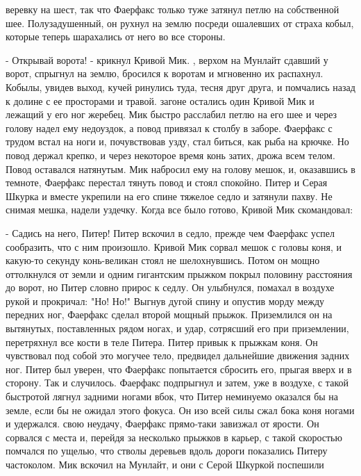 веревку на шест, так что Фаерфакс только туже затянул петлю на 
собственной шее. Полузадушенный, он рухнул на землю посреди ошалевших 
от страха кобыл, которые теперь шарахались от него во все стороны.
\par- Открывай ворота! - крикнул Кривой Мик.
, верхом на Мунлайт сдавший у ворот, спрыгнул на землю, 
бросился к воротам и мгновенно их распахнул. Кобылы, увидев выход, 
кучей ринулись туда, тесня друг друга, и помчались назад к долине с ее 
просторами и травой.
 загоне остались один Кривой Мик и лежащий у его ног жеребец. Мик 
быстро расслабил петлю на его шее и через голову надел ему недоуздок, 
а повод привязал к столбу в заборе. Фаерфакс с трудом встал на ноги и, 
почувствовав узду, стал биться, как рыба на крючке. Но повод держал 
крепко, и через некоторое время конь затих, дрожа всем телом. Повод 
оставался натянутым.
 Мик набросил ему на голову мешок, и, оказавшись в темноте, 
Фаерфакс перестал тянуть повод и стоял спокойно.
 Питер и Серая Шкурка и вместе укрепили на его спине 
тяжелое седло и затянули пахву. Не снимая мешка, надели уздечку. Когда 
все было готово, Кривой Мик скомандовал:
\par- Садись на него, Питер!
 Питер вскочил в седло, прежде чем Фаерфакс успел сообразить, что 
с ним произошло.
 Кривой Мик сорвал мешок с головы коня, и какую-то секунду 
конь-великан стоял не шелохнувшись. Потом он мощно оттолкнулся от 
земли и одним гигантским прыжком покрыл половину расстояния до ворот, 
но Питер словно прирос к седлу. Он улыбнулся, помахал в воздухе рукой 
и прокричал: "Но! Но!" Выгнув дугой спину и опустив морду между 
передних ног, Фаерфакс сделал второй мощный прыжок. Приземлился он на 
вытянутых, поставленных рядом ногах, и удар, сотрясший его при 
приземлении, перетряхнул все кости в теле Питера.
 Питер привык к прыжкам коня. Он чувствовал под собой это 
могучее тело, предвидел дальнейшие движения задних ног. Питер был 
уверен, что Фаерфакс попытается сбросить его, прыгая вверх и в 
сторону. Так и случилось. Фаерфакс подпрыгнул и затем, уже в воздухе, 
с такой быстротой лягнул задними ногами вбок, что Питер неминуемо 
оказался бы на земле, если бы не ожидал этого фокуса. Он изо всей силы 
сжал бока коня ногами и удержался.
 свою неудачу, Фаерфакс прямо-таки завизжал от ярости. Он 
сорвался с места и, перейдя за несколько прыжков в карьер, с такой 
скоростью помчался по ущелью, что стволы деревьев вдоль дороги 
показались Питеру частоколом.
 Мик вскочил на Мунлайт, и они с Серой Шкуркой поспешили 
